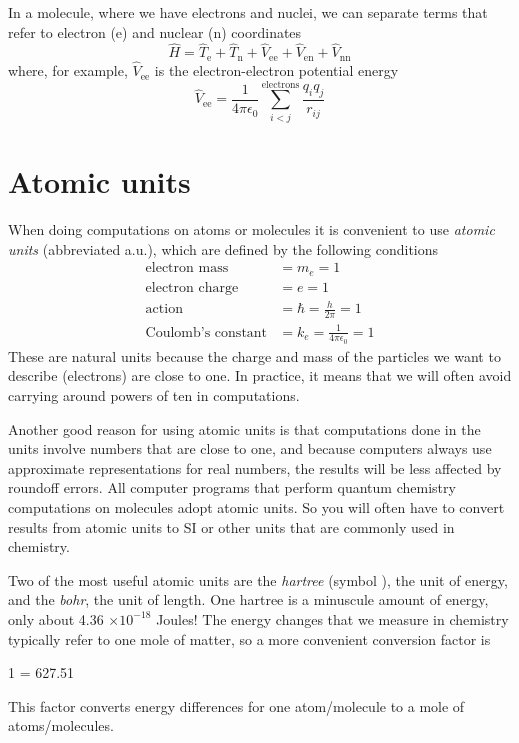 \documentclass[../Main/chem371-notes.tex]{subfiles}
\begin{document}
In a molecule, where we have electrons and nuclei, we can separate terms that refer to electron (e) and nuclear (n) coordinates
\begin{equation}
\hat{H} = \hat{T}_\mathrm{e} + \hat{T}_\mathrm{n} +  \hat{V}_\mathrm{ee} + \hat{V}_\mathrm{en} + \hat{V}_\mathrm{nn}
\end{equation}
where, for example, $\hat{V}_\mathrm{ee}$ is the electron-electron potential energy
\begin{equation}
\hat{V}_\mathrm{ee} = \frac{1}{4\pi \epsilon_0}  \sum_{i < j}^{\mathrm{electrons}} \frac{q_i q_j}{r_{ij}}
\end{equation}


\section{Atomic units}
When doing computations on atoms or molecules it is convenient to use \emph{atomic units} (abbreviated a.u.), which are defined by the following conditions
\begin{align}
\text{electron mass} & = m_e = 1\\
\text{electron charge} & = e = 1\\
\text{action} & = \hbar = \frac{h}{2\pi} = 1\\
\text{Coulomb's constant} & = k_e = \frac{1}{4\pi \epsilon_0} = 1
\end{align}
These are natural units because the charge and mass of the particles we want to describe (electrons) are close to one.
In practice, it means that we will often avoid carrying around powers of ten in computations.

Another good reason for using atomic units is that computations done in the units involve numbers that are close to one, and because computers always use approximate representations for real numbers, the results will be less affected by roundoff errors.
All computer programs that perform quantum chemistry computations on molecules adopt atomic units.
So you will often have to convert results from atomic units to SI or other units that are commonly used in chemistry.

Two of the most useful atomic units are the \emph{hartree} (symbol  \Eh), the unit of energy, and the \emph{bohr}, the unit of length.
One hartree is a minuscule amount of energy, only about 4.36 $\times 10^{-18}$ Joules!
The energy changes that we measure in chemistry typically refer to one mole of matter, so a more convenient conversion factor is 
\begin{iequation}
1  = 627.51 
\end{iequation}
This factor converts energy differences for one atom/molecule to a mole of atoms/molecules.
\end{document}
